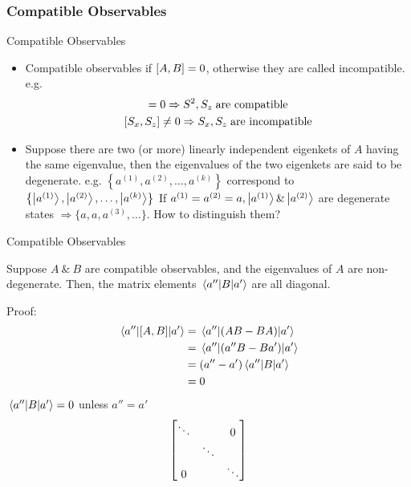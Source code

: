 \subsubsection{Compatible Observables}
\begin{frame}{Compatible Observables}
	\begin{itemize}
		\item Compatible observables if $\comm{A}{B} = 0$, otherwise they are called incompatible. e.g.
		      \begin{gather*}
			      [S^2,S_z] = 0 \Rightarrow S^2,S_z \; \text{are compatible}\\
			      \comm{S_x}{S_z} \neq 0 \Rightarrow S_x,S_z \; \text{are incompatible}
		      \end{gather*}
		\item Suppose there are two (or more) linearly independent eigenkets of $A$ having the same eigenvalue, then the eigenvalues of the two eigenkets are said to be degenerate. e.g. $\left\{ a^{(1)}, a^{(2)},\dots,a^{(k)}\right\}$ correspond to $\left\{\ket{a^{(1)}},\ket{a^{(2)}},\dots,\ket{a^{(k)}}	\right\}$
		      If $a^{(1)} = a^{(2)} = a, \ket{a^{(1)}} \& \ket{a^{(2)}}$ are degenerate states $\Rightarrow \{a,a,a^{(3)} ,\dots\}$. How to distinguish them?
	\end{itemize}
\end{frame}

\begin{frame}{Compatible Observables}
	\begin{theorem}[2]
		Suppose $A \ \&\  B$ are compatible observables, and the eigenvalues of $A$ are non-degenerate. Then, the matrix elements $\mel{a''}{B}{a'}$ are all diagonal.
	\end{theorem}

	Proof:
	\begin{align*}
		\mel{a''}{\comm{A}{B}}{a'} & = \mel{a''}{(AB - BA)}{a'}    \\
		                           & = \mel{a''}{(a''B -B a')}{a'} \\
		                           & = (a'' - a') \mel{a''}{B}{a'} \\
		                           & = 0
	\end{align*}
	$\mel{a''}{B}{a'} = 0 $ unless $a'' = a'$
	\[
		\mqty[\ddots\admat{0,\ddots,0}\ddots]
	\]
\end{frame}

